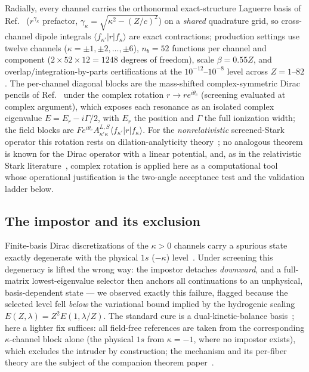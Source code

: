 \documentclass[aps,pra,twocolumn,superscriptaddress,floatfix,longbibliography]{revtex4-2}
\begin{document}
Radially, every channel carries the orthonormal exact-structure
Laguerre basis of Ref.~\cite{companionA} ($r^{\gamma_\kappa}$
prefactor, $\gamma_\kappa=\sqrt{\kappa^{2}-(Z/c)^{2}}$) on a
\emph{shared} quadrature grid, so cross-channel dipole integrals
$\langle f_{\kappa'}|r|f_{\kappa}\rangle$ are exact contractions;
production settings use twelve channels
($\kappa=\pm1,\pm2,\dots,\pm6$), $n_b=52$ functions per channel and
component ($2\times52\times12=1248$ degrees of freedom), scale
$\beta=0.55Z$, and
overlap/integration-by-parts certifications at the
$10^{-12}$--$10^{-8}$ level across $Z=1$--$82$. The per-channel
diagonal blocks are the mass-shifted complex-symmetric Dirac pencils
of Ref.~\cite{companionB} under the complex rotation
$r\to re^{i\theta_c}$ (screening evaluated at complex argument),
which exposes each resonance as an isolated complex eigenvalue
$E=E_r-i\Gamma/2$, with $E_r$ the position and $\Gamma$ the full
ionization width; the field blocks are $F e^{i\theta_c}
A^{L,S}_{\kappa'\kappa}\langle f_{\kappa'}|r|f_{\kappa}\rangle$. For
the \emph{nonrelativistic} screened-Stark operator this rotation
rests on dilation-analyticity
theory~\cite{AguilarCombes1971,HerbstSimon1978,Herbst1979}; no
analogous theorem is known for the Dirac operator with a linear
potential, and, as in the relativistic Stark
literature~\cite{IvanovHo2004,Maltsev2023}, complex rotation is
applied here as a computational tool~\cite{Ho1983,Moiseyev1998}
whose operational justification is the two-angle acceptance test and
the validation ladder below.

\subsection{The impostor and its exclusion}

Finite-basis Dirac discretizations of the $\kappa>0$ channels carry
a spurious state exactly degenerate with the physical $1s$
($-\kappa$) level~\cite{DrakeGoldman1981,TupitsynShabaev2008}.
Under screening this degeneracy is lifted the wrong way: the
impostor detaches \emph{downward}, and a full-matrix
lowest-eigenvalue selector then anchors all continuations to an
unphysical, basis-dependent state --- we observed exactly this
failure, flagged because the selected level fell \emph{below} the
variational bound implied by the hydrogenic scaling
$E(Z,\lambda)=Z^{2}E(1,\lambda/Z)$. The standard cure is a
dual-kinetic-balance basis~\cite{Shabaev2004}; here a lighter fix
suffices: all field-free references are
taken from the corresponding $\kappa$-channel block alone
(the physical $1s$ from $\kappa=-1$, where no impostor exists),
which excludes the intruder by construction; the mechanism and its
per-fiber theory are the subject of the companion theorem
paper~\cite{companionT}.
\end{document}
